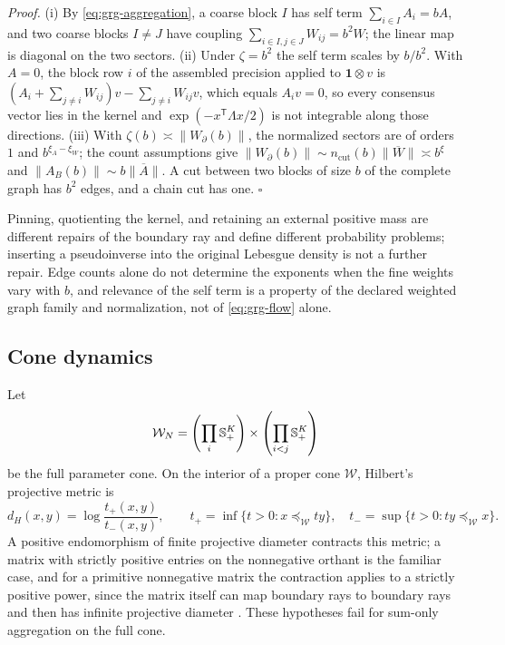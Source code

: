 \noindent\emph{Proof.}
(i) By \eqref{eq:grg-aggregation}, a coarse block \(I\) has self term
\(\sum_{i\in I}A_i=bA\), and two coarse blocks \(I\neq J\) have coupling
\(\sum_{i\in I,j\in J}W_{ij}=b^2W\); the linear map is diagonal on the two
sectors. (ii) Under \(\zeta=b^2\) the self term scales by \(b/b^2\). With
\(A=0\), the block row \(i\) of the assembled precision applied to
\(\mathbf1\otimes v\) is
\((A_i+\sum_{j\neq i}W_{ij})v-\sum_{j\neq i}W_{ij}v\), which equals
\(A_iv=0\), so every
consensus vector lies in the kernel and \(\exp(-x^{\mathsf T}\Lambda x/2)\) is
not integrable along those directions. (iii) With \(\zeta(b)\asymp
\lVert W_\partial(b)\rVert\), the normalized sectors are of orders \(1\) and
\(b^{\xi_A-\xi_W}\); the count assumptions give
\(\lVert W_\partial(b)\rVert\sim n_{\mathrm{cut}}(b)\lVert\overline W\rVert\asymp
b^\xi\) and \(\lVert A_B(b)\rVert\sim b\lVert\overline A\rVert\). A cut between
two blocks of size \(b\) of the complete graph has \(b^2\) edges, and a chain
cut has one. \(\square\)

Pinning, quotienting the kernel, and retaining an external positive mass are
different repairs of the boundary ray and define different probability
problems; inserting a pseudoinverse into the original Lebesgue density is not
a further repair. Edge counts alone do not determine the exponents when the
fine weights vary with \(b\), and relevance of the self term is a property of
the declared weighted graph family and normalization, not of
\eqref{eq:grg-flow} alone.

\subsection{Cone dynamics}
\label{sec:grg-cones}

Let
\begin{equation}
\mathcal W_N
=\left(\prod_i\mathbb S_{+}^K\right)\times\left(\prod_{i<j}\mathbb S_{+}^K\right)
\label{eq:grg-full-cone}
\end{equation}
be the full parameter cone. On the interior of a proper cone \(\mathcal W\),
Hilbert's projective metric is
\begin{equation}
d_H(x,y)=\log\frac{t_+(x,y)}{t_-(x,y)},
\qquad
t_+=\inf\{t>0:x\preceq_{\mathcal W}ty\},
\quad
t_-=\sup\{t>0:ty\preceq_{\mathcal W}x\}.
\label{eq:grg-hilbert}
\end{equation}
A positive endomorphism of finite projective diameter contracts this metric; a
matrix with strictly positive entries on the nonnegative orthant is the
familiar case, and for a primitive nonnegative matrix the contraction applies
to a strictly positive power, since the matrix itself can map boundary rays to
boundary rays and then has infinite projective diameter
\citep{Birkhoff1957,nussbaum1988hilbert}. These hypotheses fail for sum-only
aggregation on the full cone.

